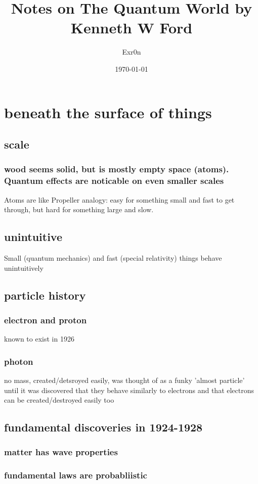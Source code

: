 \documentclass[letterpaper]{article}
\author{Exr0n}
\date{\today}
\title{Notes on The Quantum World by Kenneth W Ford}
\renewcommand{\tableofcontents}{}
\begin{document}
\tableofcontents

\section{beneath the surface of things}
\label{sec:org3f684a3}
\subsection{scale}
\label{sec:org8ced968}
\subsubsection{wood seems solid, but is mostly empty space (atoms). Quantum effects are noticable on even smaller scales}
\label{sec:orge39120a}
Atoms are like Propeller analogy: easy for something small and fast to get through, but hard for something large and slow.
\subsection{unintuitive}
\label{sec:orga2cbaca}
Small (quantum mechanics) and fast (special relativity) things behave unintuitively
\subsection{particle history}
\label{sec:orgd99744c}
\subsubsection{electron and proton}
\label{sec:orgf5b23a5}
known to exist in 1926
\subsubsection{photon}
\label{sec:orge2665a9}
no mass, created/detsroyed easily, was thought of as a funky 'almost particle' until it was discovered that they behave similarly to electrons and that electrons can be created/destroyed easily too
\subsection{fundamental discoveries in 1924-1928}
\label{sec:org8eb35a4}
\subsubsection{matter has wave properties}
\label{sec:org229494c}
\subsubsection{fundamental laws are probabliistic}
\label{sec:orga487459}
\end{document}
